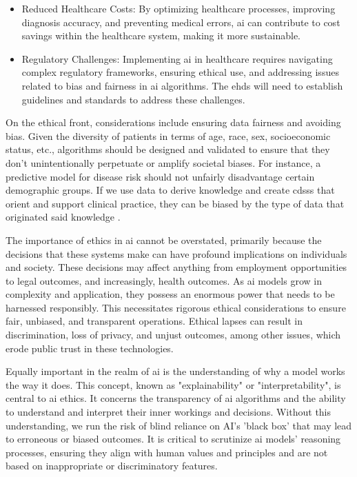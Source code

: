 \begin{itemize}
\item Reduced Healthcare Costs: By optimizing healthcare processes, improving diagnosis accuracy, and preventing medical errors, \ac{ai} can contribute to cost savings within the healthcare system, making it more sustainable.

\item Regulatory Challenges: Implementing \ac{ai} in healthcare requires navigating complex regulatory frameworks, ensuring ethical use, and addressing issues related to bias and fairness in \ac{ai} algorithms. The \ac{ehds} will need to establish guidelines and standards to address these challenges.

\end{itemize}


On the ethical front, considerations include ensuring data fairness and avoiding bias. Given the diversity of patients in terms of age, race, sex, socioeconomic status, etc., algorithms should be designed and validated to ensure that they don't unintentionally perpetuate or amplify societal biases. For instance, a predictive model for disease risk should not unfairly disadvantage certain demographic groups. 
If we use data to derive knowledge and create  \acp{cdss} that orient and support clinical practice, they can be biased by the type of data that originated said knowledge \cite{EthicsGuidelinesTrustworthy2019,barocas-hardt-narayanan}.

The importance of ethics in \ac{ai} cannot be overstated, primarily because the decisions that these systems make can have profound implications on individuals and society. These decisions may affect anything from employment opportunities to legal outcomes, and increasingly, health outcomes. As \ac{ai} models grow in complexity and application, they possess an enormous power that needs to be harnessed responsibly. This necessitates rigorous ethical considerations to ensure fair, unbiased, and transparent operations. Ethical lapses can result in discrimination, loss of privacy, and unjust outcomes, among other issues, which erode public trust in these technologies.

Equally important in the realm of \ac{ai} is the understanding of why a model works the way it does. This concept, known as "explainability" or "interpretability", is central to \ac{ai} ethics. It concerns the transparency of \ac{ai} algorithms and the ability to understand and interpret their inner workings and decisions. Without this understanding, we run the risk of blind reliance on AI's 'black box' that may lead to erroneous or biased outcomes. It is critical to scrutinize \ac{ai} models' reasoning processes, ensuring they align with human values and principles and are not based on inappropriate or discriminatory features.

